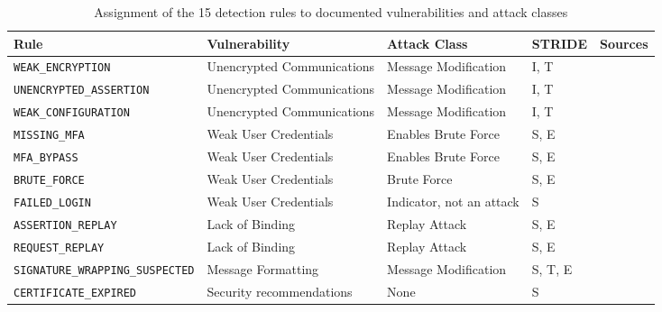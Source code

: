 \documentclass[../main.tex]{subfiles}
\begin{document}
\begin{table}[h]
\centering
\caption{Assignment of the 15 detection rules to documented vulnerabilities and attack classes}\label{tab:rules}
\small
\begin{tabular}{>{\raggedright\arraybackslash}p{3.3cm}>{\raggedright\arraybackslash}p{2.7cm}>{\raggedright\arraybackslash}p{2.4cm}p{1.3cm}l}
\toprule
Rule & Vulnerability & Attack Class & STRIDE & Sources \\
\midrule
\texttt{WEAK\_\allowbreak{}ENCRYPTION}                            & Unencrypted Communications & Message Modification     & I, T    & \cite{FIMSurvey,BSITR02102,SAMLSecurityConsideration} \\
\texttt{UNENCRYPTED\_\allowbreak{}ASSERTION}                      & Unencrypted Communications & Message Modification     & I, T    & \cite{FIMSurvey,ShibbolethGIAC} \\
\texttt{WEAK\_\allowbreak{}CONFIGURATION}                         & Unencrypted Communications & Message Modification     & I, T    & \cite{FIMSurvey} \\
\texttt{MISSING\_\allowbreak{}MFA}                                & Weak User Credentials      & Enables Brute Force      & S, E    & \cite{FIMSurvey} \\
\texttt{MFA\_\allowbreak{}BYPASS}                                 & Weak User Credentials      & Enables Brute Force      & S, E    & \cite{FIMSurvey} \\
\texttt{BRUTE\_\allowbreak{}FORCE}                                & Weak User Credentials      & Brute Force              & S, E    & \cite{FIMSurvey} \\
\texttt{FAILED\_\allowbreak{}LOGIN}                               & Weak User Credentials      & Indicator, not an attack & S       & \cite{OWASPA09} \\
\texttt{ASSERTION\_\allowbreak{}REPLAY}                           & Lack of Binding            & Replay Attack            & S, E    & \cite{FIMSurvey,SAMLSecurityConsideration} \\
\texttt{REQUEST\_\allowbreak{}REPLAY}                             & Lack of Binding            & Replay Attack            & S, E    & \cite{FIMSurvey,SAMLSecurityConsideration} \\
\texttt{SIGNATURE\_\allowbreak{}WRAPPING\_\allowbreak{}SUSPECTED} & Message Formatting         & Message Modification     & S, T, E & \cite{BreakingSAML,ShibbolethGIAC} \\
\texttt{CERTIFICATE\_\allowbreak{}EXPIRED}                        & Security recommendations   & None                     & S       & \cite{SAMLSecurityConsideration} \\

\end{tabular}
\end{table}
\end{document}
